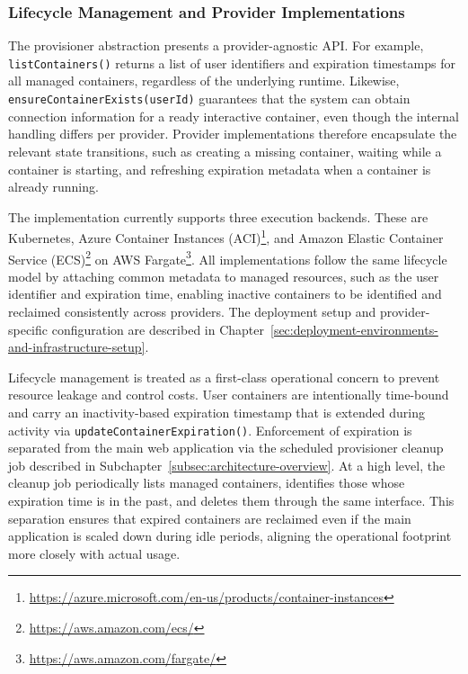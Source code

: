\subsubsection{Lifecycle Management and Provider Implementations} \label{subsubsec:lifecycle-management-and-provider-implementations}
The provisioner abstraction presents a provider-agnostic API\@.
For example, \texttt{listContainers()} returns a list of user identifiers and expiration timestamps for all managed containers, regardless of the underlying runtime.
Likewise, \texttt{ensureContainerExists(userId)} guarantees that the system can obtain connection information for a ready interactive container, even though the internal handling differs per provider.
Provider implementations therefore encapsulate the relevant state transitions, such as creating a missing container, waiting while a container is starting, and refreshing expiration metadata when a container is already running.

The implementation currently supports three execution backends.
These are Kubernetes, Azure Container Instances (ACI)\footnote{\url{https://azure.microsoft.com/en-us/products/container-instances}}, and Amazon Elastic Container Service (ECS)\footnote{\url{https://aws.amazon.com/ecs/}} on AWS Fargate\footnote{\url{https://aws.amazon.com/fargate/}}.
All implementations follow the same lifecycle model by attaching common metadata to managed resources, such as the user identifier and expiration time, enabling inactive containers to be identified and reclaimed consistently across providers.
The deployment setup and provider-specific configuration are described in Chapter~\ref{sec:deployment-environments-and-infrastructure-setup}.

Lifecycle management is treated as a first-class operational concern to prevent resource leakage and control costs.
User containers are intentionally time-bound and carry an inactivity-based expiration timestamp that is extended during activity via \texttt{updateContainerExpiration()}.
Enforcement of expiration is separated from the main web application via the scheduled provisioner cleanup job described in Subchapter~\ref{subsec:architecture-overview}.
At a high level, the cleanup job periodically lists managed containers, identifies those whose expiration time is in the past, and deletes them through the same interface.
This separation ensures that expired containers are reclaimed even if the main application is scaled down during idle periods, aligning the operational footprint more closely with actual usage.

